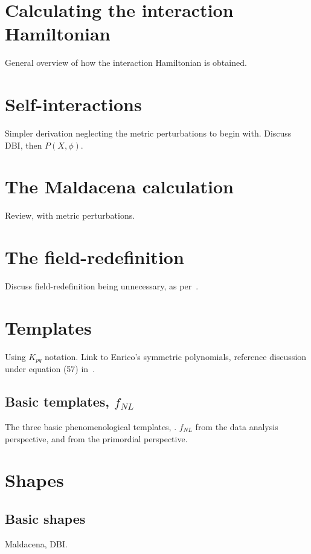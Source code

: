     \section{Calculating the interaction Hamiltonian}
    General overview of how the interaction Hamiltonian is obtained.
    \newpage
    \section{Self-interactions}
    Simpler derivation neglecting the metric perturbations to begin with.
    \newpage
    Discuss DBI, then $P(X, \phi)$.
    \newpage
    \section{The Maldacena calculation}
    Review, with metric perturbations.
    \newpage
    \section{The field-redefinition}
    Discuss field-redefinition being unnecessary, as per~\cite{px_burrage}.
    \newpage
    \section{Templates}
    Using $K_{pq}$ notation.
    Link to Enrico's symmetric polynomials, reference discussion under
    equation (57) in~\cite{Fergusson_2010}.
    \newpage
    \subsection{Basic templates, $f_{NL}$}
    The three basic phenomenological templates, \planck.
    $f_{NL}$ from the data analysis perspective,
    and from the primordial perspective.
    \section{Shapes}
    \subsection{Basic shapes}
    Maldacena, DBI.
